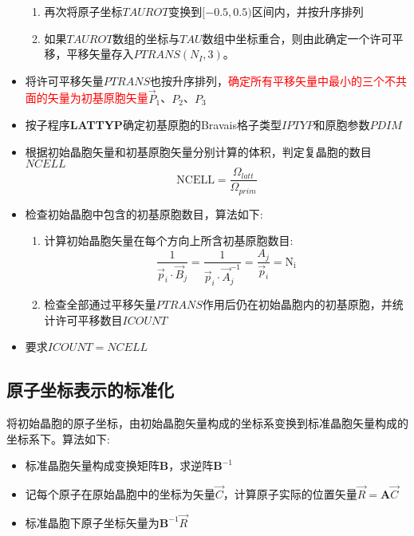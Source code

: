 \documentclass{article}      %
\begin{document}
\begin{itemize}
\begin{enumerate}
			\item 再次将原子坐标$\mathit{TAUROT}$变换到$[-0.5,0.5)$区间内，并按升序排列
			\item 如果$\mathit{TAUROT}$数组的坐标与$\mathit{TAU}$数组中坐标重合，则由此确定一个许可平移，平移矢量存入$\mathit{PTRANS}(N_I,3)$。
		\end{enumerate}
	\item 将许可平移矢量$\mathit{PTRANS}$也按升序排列，\textcolor{red}{确定所有平移矢量中最小的三个不共面的矢量为初基原胞矢量}$\vec P_1$、$P_2$、$P_3$
	\item 按子程序\textbf{LATTYP}确定初基原胞的\textrm{Bravais}格子类型$\mathit{IPTYP}$和原胞参数$\mathit{PDIM}$
        \item 根据初始晶胞矢量和初基原胞矢量分别计算的体积，判定复晶胞的数目$\mathit{NCELL}$
\begin{displaymath}
	\mathrm{NCELL}=\dfrac{\Omega_{latt}}{\Omega_{prim}}
\end{displaymath}
	\item 检查初始晶胞中包含的初基原胞数目，算法如下:~
		\begin{enumerate}
			\item 计算初始晶胞矢量在每个方向上所含初基原胞数目:
		\begin{displaymath}
			\dfrac1{\vec p_i\cdot\vec B_j}=\dfrac1{\vec p_i\cdot\vec A_j^{-1}}=\dfrac{A_j}{\vec p_i}=\mathrm{N_{i}}
		\end{displaymath}
	\item 检查全部通过平移矢量$\mathit{PTRANS}$作用后仍在初始晶胞内的初基原胞，并统计许可平移数目$\mathit{ICOUNT}$
		\end{enumerate}
	\item 要求$\mathit{ICOUNT}=\mathit{NCELL}$
\end{itemize}

\subsection{原子坐标表示的标准化}
将初始晶胞的原子坐标，由初始晶胞矢量构成的坐标系变换到标准晶胞矢量构成的坐标系下。算法如下:~
\begin{itemize}
	\item 标准晶胞矢量构成变换矩阵$\mathbf B$，求逆阵$\mathbf{B}^{-1}$
	\item 记每个原子在原始晶胞中的坐标为矢量$\vec C$，计算原子实际的位置矢量$\vec R=\mathbf{A}\vec C$
	\item 标准晶胞下原子坐标矢量为$\mathbf{B}^{-1}\vec R$
\end{itemize}
\end{document}
